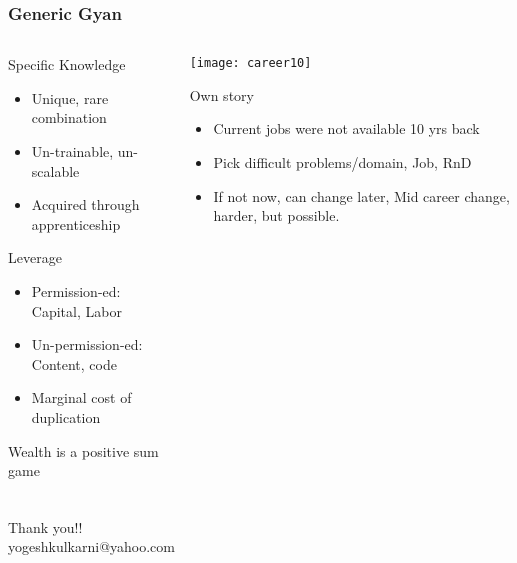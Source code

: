 \begin{frame}[fragile]\frametitle{Generic Gyan}
\begin{columns}
    \begin{column}[T]{0.5\linewidth}
			Specific Knowledge

      \begin{itemize}
			\item Unique, rare combination
			\item Un-trainable, un-scalable
			\item Acquired through apprenticeship
			\end{itemize}
			
			Leverage
      \begin{itemize}
			\item Permission-ed: Capital, Labor
			\item Un-permission-ed: Content, code
			\item Marginal cost of duplication
			\end{itemize}
			
			Wealth is a positive sum game
			
    \end{column}
    \begin{column}[T]{0.5\linewidth}
		
			\begin{center}
			\texttt{[image: career10]}
			\end{center}

			Own story
      \begin{itemize}
			\item Current jobs were not available 10 yrs back
			\item Pick difficult problems/domain, Job, RnD
			\item If not now, can change later, Mid career change, harder, but possible.
			\end{itemize}		
    \end{column}
  \end{columns}
	
\end{frame}

\begin{frame}[fragile]\frametitle{}
	
	\begin{center}
	{\Large Thank you!!}  \\
	
	yogeshkulkarni@yahoo.com

	\end{center}

\end{frame}
